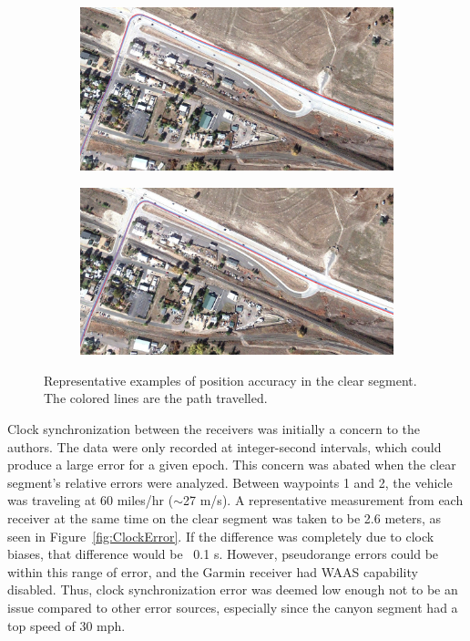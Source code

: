 \documentclass[]{aiaa-tc}%
\begin{document}
	\begin{figure}[H]
		\centering
		\begin{subfigure}
			\centering
			\includegraphics[width = 13cm]{inboutClearSeg.PNG}
		\end{subfigure}
		\begin{subfigure}
			\centering
			\includegraphics[width = 13cm]{outboutClearSeg.PNG}
		\end{subfigure}
		\caption{Representative examples of position accuracy in the clear segment. The colored lines are the path travelled.}
		\label{fig:inboutClearSeg}
	\end{figure}
	
	\noindent Clock synchronization between the receivers was initially a concern to the authors. The data were only recorded at integer-second intervals, which could produce a large error for a given epoch. This concern was abated when the clear segment's relative errors were analyzed. Between waypoints 1 and 2, the vehicle was traveling at 60 miles/hr ($\sim$27 m/s). A representative measurement from each receiver at the same time on the clear segment was taken to be 2.6 meters, as seen in Figure~\ref{fig:ClockError}. If the difference was completely due to clock biases, that difference would be ~0.1 s. However, pseudorange errors could be within this range of error, and the Garmin receiver had WAAS capability disabled. Thus, clock synchronization error was deemed low enough not to be an issue compared to other error sources, especially since the canyon segment had a top speed of 30 mph.
	
\end{document}
